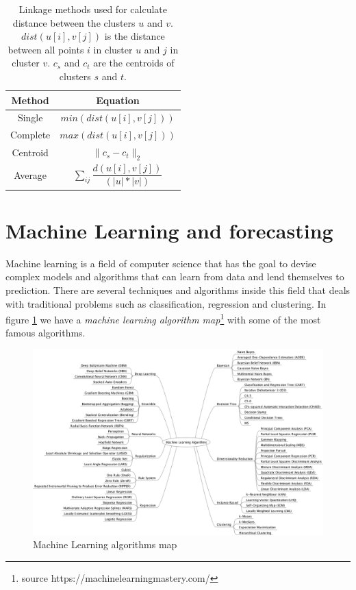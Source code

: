 \documentclass[12pt]{report}
\begin{document}
\begin{table}
\begin{center}
\begin{tabular}{cc}
\toprule
\textbf{Method} & \textbf{Equation}\\
\midrule
Single & $min(dist(u[i],v[j]))$ \\[0.3cm]
Complete & $ max(dist(u[i],v[j]))$\\[0.3cm]
Centroid & $\|c_s - c_t \|_{2}$ \\[0.3cm]
Average & $ \sum_{ij} \dfrac{d(u[i],v[j])}{(|u| \ast |v|)} $ \\
\bottomrule
\end{tabular}
\caption{Linkage methods used for calculate distance between the clusters $u$ and $v$. $dist(u[i],v[j])$ is the distance between all points $i$ in cluster $u$ and $j$ in cluster $v$. $c_s$ and $c_t$ are the centroids of clusters $s$ and $t$.}
\label{tab:linkage}
\end{center}
\end{table}


\section{Machine Learning and forecasting}

Machine learning is a field of computer science that has the goal to devise complex models and algorithms that can learn from data and lend themselves to prediction. There are several techniques and algorithms inside this field that deals with traditional problems such as classification, regression and clustering. In figure \ref{fig:ml} we have a \textit{machine learning algorithm map}\footnote{source https://machinelearningmastery.com/} with some of the most famous algorithms.

\begin{figure}[!ht]
\centering
\includegraphics[width=\textwidth]{MachineLearningAlgorithms.png}
\caption{Machine Learning algorithms map}
\label{fig:ml}
\end{figure}
\end{document}
